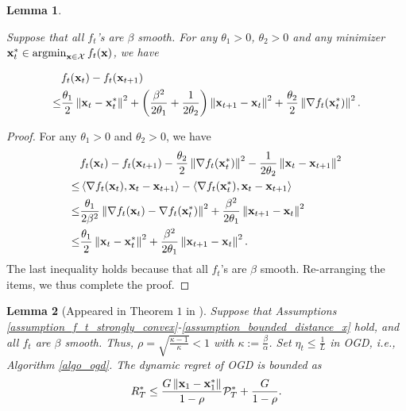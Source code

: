 \documentclass{article}
\newtheorem{Lemma}{\bf{Lemma}}
\begin{document}
\begin{Lemma}
\label{lemma_f_upper_bound} 

Suppose that all $f_t$'s are $\beta$ smooth. For any $\theta_1>0$, $\theta_2>0$ and any   minimizer $\x_t^{\ast} \in \argmin_{\x\in\Xcal}f_t(\x)$, we have 

\begin{align}
\label{equa_f_upper_bound}
& f_t({\bf x}_t) - f_t({\bf x}_{t+1})  \\ \nonumber
\le & \frac{\theta_1}{2}\left\lVert{\bf x}_t - {\bf x}_t^{\ast}\right\rVert^2 + \left( \frac{\beta^2}{2\theta_1}+\frac{1}{2\theta_2} \right)\left\lVert{\bf x}_{t+1} - {\bf x}_t\right\rVert^2  +\frac{\theta_2}{2}\left\lVert\nabla f_t({\bf x}_t^{\ast})\right\rVert^2.
\end{align}
\end{Lemma}
\begin{proof}
For any $\theta_1>0$ and $\theta_2>0$, we have
\begin{align}
\nonumber
&f_t({\bf x}_t) - f_t({\bf x}_{t+1}) -\frac{\theta_2}{2}\left\lVert\nabla f_t({\bf x}_t^{\ast})\right\rVert^2 - \frac{1}{2\theta_2} \left\lVert{\bf x}_t - {\bf x}_{t+1}\right\rVert^2\\ \nonumber
\le & \left\langle\nabla f_t({\bf x}_t), {\bf x}_t - {\bf x}_{t+1} \right\rangle - \left\langle\nabla f_t({\bf x}_t^{\ast}), {\bf x}_t - {\bf x}_{t+1} \right\rangle  \\ \nonumber
\le & \frac{\theta_1}{2\beta^2}\left\lVert\nabla f_t({\bf x}_t) - \nabla f_t({\bf x}_t^{\ast})\right\rVert^2 + \frac{\beta^2}{2\theta_1}\left\lVert{\bf x}_{t+1} - {\bf x}_t\right\rVert^2 \\ \nonumber
\le & \frac{\theta_1}{2}\left\lVert{\bf x}_t - {\bf x}_t^{\ast}\right\rVert^2 + \frac{\beta^2}{2\theta_1}\left\lVert{\bf x}_{t+1} - {\bf x}_t\right\rVert^2.
\end{align} The last inequality holds because that all $f_t$'s are $\beta$ smooth. Re-arranging the items, we thus complete the proof.
\end{proof}





\begin{Lemma}[Appeared in Theorem $1$ in \cite{Mokhtari:2016jz} ]
\label{lemma_strongly_convex_regret}
Suppose that Assumptions \ref{assumption_f_t_strongly_convex}-\ref{assumption_bounded_distance_x} hold, and all $f_t$ are $\beta$ smooth. Thus, $\rho = \sqrt{\frac{\kappa-1}{\kappa}} <1$ with $\kappa := \frac{\beta}{\alpha}$. Set $\eta_t \le \frac{1}{L}$ in OGD, i.e., Algorithm \ref{algo_ogd}. The dynamic regret of OGD is bounded as
\begin{align}
\nonumber
R_T^{\ast} \le \frac{G\left\lVert{\bf x}_1-{\bf x}_1^{\ast}\right\rVert}{1-\rho} {\mathcal{P}}_T^{\ast} + \frac{G}{1-\rho}.
\end{align}

\end{Lemma}
\end{document}

